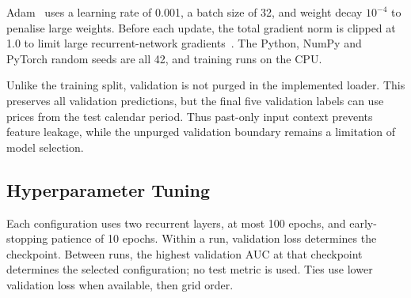 Adam~\cite{b_kingma2015adam} uses a learning rate of 0.001, a batch size of 32, and weight decay $10^{-4}$ to penalise large weights. Before each update, the total gradient norm is clipped at 1.0 to limit large recurrent-network gradients~\cite{b_pascanu2013clipping}. The Python, NumPy and PyTorch random seeds are all 42, and training runs on the CPU.

Unlike the training split, validation is not purged in the implemented loader. This preserves all validation predictions, but the final five validation labels can use prices from the test calendar period. Thus past-only input context prevents feature leakage, while the unpurged validation boundary remains a limitation of model selection.

\subsection{Hyperparameter Tuning}
Each configuration uses two recurrent layers, at most 100 epochs, and early-stopping patience of 10 epochs. Within a run, validation loss determines the checkpoint. Between runs, the highest validation AUC at that checkpoint determines the selected configuration; no test metric is used. Ties use lower validation loss when available, then grid order.

